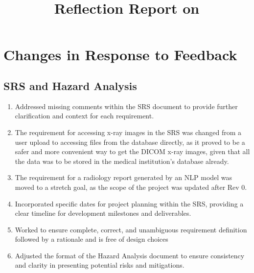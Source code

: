 \documentclass{article}
\title{Reflection Report on \progname}
\author{\authname}
\date{}
\begin{document}
\maketitle


\section{Changes in Response to Feedback}



\subsection{SRS and Hazard Analysis}

\begin{enumerate}
    \item Addressed missing comments within the SRS document to provide further clarification and context for each requirement.
    \item The requirement for accessing x-ray images in the SRS was changed from a user upload to accessing files from the database directly, as it proved to be a safer and more convenient way to get the DICOM x-ray images, given that all the data was to be stored in the medical institution's database already.
    \item The requirement for a radiology report generated by an NLP model was moved to a stretch goal, as the scope of the project was updated after Rev 0.
    \item Incorporated specific dates for project planning within the SRS, providing a clear timeline for development milestones and deliverables.
    \item Worked to ensure complete, correct, and unambiguous requirement definition followed by a rationale and is free of design choices
    \item Adjusted the format of the Hazard Analysis document to ensure consistency and clarity in presenting potential risks and mitigations.
\end{enumerate}
\end{document}
